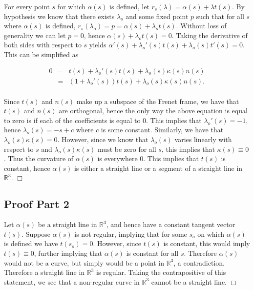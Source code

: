 \documentclass{article}
\begin{document}
\noindent For every point $s$ for which $\alpha(s)$ is defined, let $r_s(\lambda) = \alpha(s) + \lambda t(s)$.  By hypothesis we know that there exists $\lambda_o$ and some fixed point $p$ such that for all $s$ where $\alpha(s)$ is defined, $r_s(\lambda_o) = p = \alpha(s) + \lambda_ot(s)$.  Without loss of generality we can let $p=0$, hence $\alpha(s) + \lambda_ot(s) = 0$.  Taking the derivative of both sides with respect to $s$ yields $\alpha'(s) + \lambda_o'(s) t(s) + \lambda_o(s) t'(s) = 0$.  This can be simplified as 

\begin{eqnarray*}
0 & = & t(s) + \lambda_o'(s) t(s) + \lambda_o(s) \kappa(s) n(s) \\
& = & (1 + \lambda_o'(s)) t(s) + \lambda_o(s)\kappa(s) n(s). \\
\end{eqnarray*}

\noindent Since $t(s)$ and $n(s)$ make up a subspace of the Frenet frame, we have that $t(s)$ and $n(s)$ are orthogonal, hence the only way the above equation is equal to zero is if each of the coefficients is equal to 0.  This implies that $\lambda_o'(s) = -1$, hence $\lambda_o(s) = -s + c$ where $c$ is some constant.  Similarly, we have that $\lambda_o(s) \kappa(s) = 0$.  However, since we know that $\lambda_o(s)$ varies linearly with respect to $s$ and $\lambda_o(s)\kappa(s)$ must be zero for all $s$, this implies that $\kappa(s) \equiv 0$.  Thus the curvature of $\alpha(s)$ is everywhere 0.  This implies that $t(s)$ is constant, hence $\alpha(s)$ is either a straight line or a segment of a straight line in $\mathbb{R}^3$.  \hfill $\Box$


\subsection*{Proof Part 2}

\noindent Let $\alpha(s)$ be a straight line in $\mathbb{R}^3$, and hence have a constant tangent vector $t(s)$.  Suppose $\alpha(s)$ is not regular, implying that for some $s_o$ on which $\alpha(s)$ is defined we have $t(s_o) = 0$.  However, since $t(s)$ is constant, this would imply $t(s) \equiv 0$, further implying that $\alpha(s)$ is constant for all $s$.  Therefore $\alpha(s)$ would not be a curve, but simply would be a point in $\mathbb{R}^3$, a contradiction.  Therefore a straight line in $\mathbb{R}^3$ is regular.  Taking the contrapositive of this statement, we see that a non-regular curve in $\mathbb{R}^3$ cannot be a straight line.  \hfill $\Box$
\end{document}
